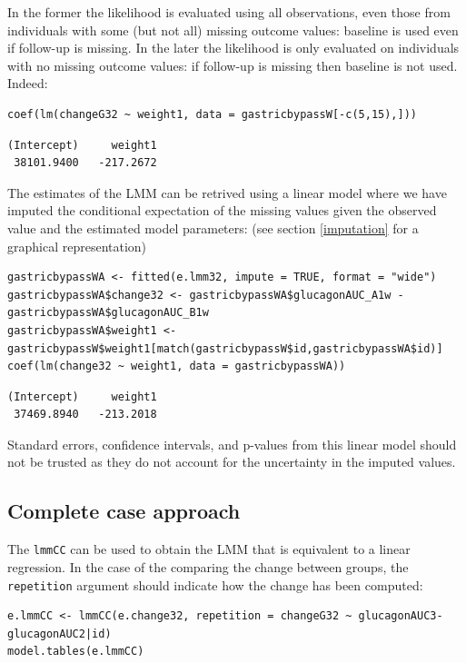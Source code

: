 \documentclass[12pt]{article}
\newcommand\Warning[1][3ex]{%
\renewcommand\stacktype{L}%
\scaleto{\stackon[1.3pt]{\color{red}$\triangle$}{\tiny\bfseries !}}{#1}%
\xspace
}
\begin{document}
In the former the likelihood is evaluated using all observations, even
those from individuals with some (but not all) missing outcome values:
baseline is used even if follow-up is missing. In the later the
likelihood is only evaluated on individuals with no missing outcome
values: if follow-up is missing then baseline is not used. Indeed:
\lstset{language=r,label= ,caption= ,captionpos=b,numbers=none}
\begin{lstlisting}
coef(lm(changeG32 ~ weight1, data = gastricbypassW[-c(5,15),]))

\end{lstlisting}

\begin{verbatim}
(Intercept)     weight1 
 38101.9400   -217.2672
\end{verbatim}


The estimates of the LMM can be retrived using a linear model where we
have imputed the conditional expectation of the missing values given
the observed value and the estimated model parameters: (see section
\ref{imputation} for a graphical representation)
\lstset{language=r,label= ,caption= ,captionpos=b,numbers=none}
\begin{lstlisting}
gastricbypassWA <- fitted(e.lmm32, impute = TRUE, format = "wide")
gastricbypassWA$change32 <- gastricbypassWA$glucagonAUC_A1w - gastricbypassWA$glucagonAUC_B1w
gastricbypassWA$weight1 <- gastricbypassW$weight1[match(gastricbypassW$id,gastricbypassWA$id)]
coef(lm(change32 ~ weight1, data = gastricbypassWA))
\end{lstlisting}

\begin{verbatim}
(Intercept)     weight1 
 37469.8940   -213.2018
\end{verbatim}



\Warning Standard errors, confidence intervals, and p-values from this
linear model should not be trusted as they do not account for the
uncertainty in the imputed values.

\subsection{Complete case approach}
\label{sec:org27628cb}

The \texttt{lmmCC} can be used to obtain the LMM that is equivalent to a
linear regression. In the case of the comparing the change between
groups, the \texttt{repetition} argument should indicate how the change has
been computed:
\lstset{language=r,label= ,caption= ,captionpos=b,numbers=none}
\begin{lstlisting}
e.lmmCC <- lmmCC(e.change32, repetition = changeG32 ~ glucagonAUC3-glucagonAUC2|id)
model.tables(e.lmmCC)
\end{lstlisting}
\end{document}
